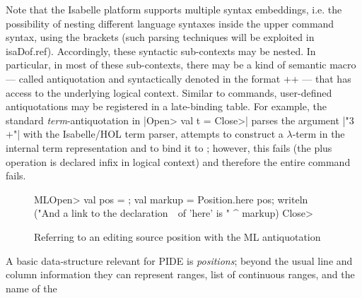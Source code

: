 \begin{isabellebody}
\begin{isamarkuptext}
Note that the Isabelle platform supports multiple syntax embeddings, i.e. the possibility
of nesting different language syntaxes inside the upper command syntax, using the
\isa{{\isacartoucheopen}\ {\isachardot}{\isachardot}\ {\isacartoucheclose}} brackets (such parsing techniques will be exploited in \csname isaDof.ref).  Accordingly, these syntactic sub-contexts may be
nested. In particular, in most of these sub-contexts, there may be a kind of semantic macro ---
called antiquotation and syntactically denoted in the format
\inlineisar++ --- that has access to the underlying logical context.
Similar to commands, user-defined antiquotations may be registered in a late-binding table. For
example, the standard \emph{term}-antiquotation in
\inlineisar|\<Open> val t =  \<Close>| parses the argument \inlineisar|"3 +"| with
the Isabelle/HOL term parser, attempts to construct a $\lambda$-term in the internal
term representation and to bind it to ; however, this fails (the plus operation is
declared infix in logical context) and therefore the entire command fails.%
\end{isamarkuptext}\isamarkuptrue%
%
\isadelimdocument
%
\endisadelimdocument
%
\isatagdocument
%
\isamarkuptrue%
%
\endisatagdocument
{\isafolddocument}%
%
\isadelimdocument
%
\endisadelimdocument
%
\begin{isamarkuptext}%
\begin{figure}
  \centering
\begin{minipage}{0.47\textwidth}
\begin{isar}
ML\<Open> val pos = ;
    val markup = Position.here pos;
    writeln ("And a link to the declaration\
              \ of 'here' is " ^ markup) \<Close>
\end{isar}
\end{minipage}
  \caption{Referring to an editing source position with the ML antiquotation }
  \label{fig:ml-pos}
\end{figure}
A basic data-structure relevant for PIDE is \emph{positions}; beyond the usual line
and column information they can represent ranges, list of continuous ranges, and the name of the

\end{isamarkuptext}
\end{isabellebody}
